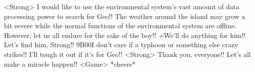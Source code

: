 <Strong> I would like to use the environmental system's vast amount of data 
processing power to search for Geo!! 
The weather around the island may grow a bit severe while the normal functions 
of the environmental system are offline. 
However, let us all endure for the sake of the boy!! 
+We'll do anything for him!! Let's find him, Strong!! 
{9B}{00}I don't care if a typhoon or something else crazy strikes!! 
I'll tough it out if it's for Geo!! 
<Strong> Thank you, everyone!! 
Let's all make a miracle happen!! 
<Game> *cheers* 
